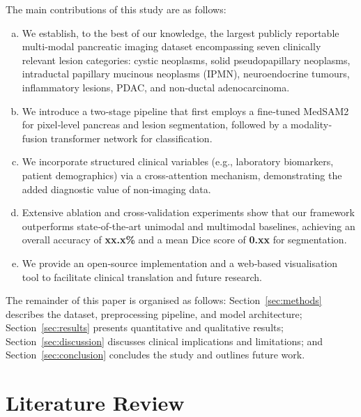 \documentclass[a4paper, fleqn]{cas-dc}
\begin{document}
    The main contributions of this study are as follows:

    \begin{enumerate}[a)]
        \item We establish, to the best of our knowledge, the largest publicly reportable
            multi‐modal pancreatic imaging dataset encompassing seven clinically
            relevant lesion categories: cystic neoplasms, solid pseudopapillary neoplasms,
            intraductal papillary mucinous neoplasms (IPMN), neuroendocrine tumours,
            inflammatory lesions, PDAC, and non‐ductal adenocarcinoma.

        \item We introduce a two‐stage pipeline that first employs a fine‐tuned MedSAM2
            for pixel‐level pancreas and lesion segmentation, followed by a
            modality‐fusion transformer network for classification.

        \item We incorporate structured clinical variables (e.g., laboratory
            biomarkers, patient demographics) via a cross‐attention mechanism, demonstrating
            the added diagnostic value of non‐imaging data.

        \item Extensive ablation and cross‐validation experiments show that our framework
            outperforms state‐of‐the‐art unimodal and multimodal baselines,
            achieving an overall accuracy of \textbf{xx.x\%} and a mean Dice score
            of \textbf{0.xx} for segmentation.

        \item We provide an open‐source implementation and a web‐based visualisation
            tool to facilitate clinical translation and future research.
    \end{enumerate}

    The remainder of this paper is organised as follows: Section~\ref{sec:methods}
    describes the dataset, preprocessing pipeline, and model architecture;
    Section~\ref{sec:results} presents quantitative and qualitative results; Section~\ref{sec:discussion}
    discusses clinical implications and limitations; and Section~\ref{sec:conclusion}
    concludes the study and outlines future work.

    \section{Literature Review}
    \label{sec:lr}
\end{document}

